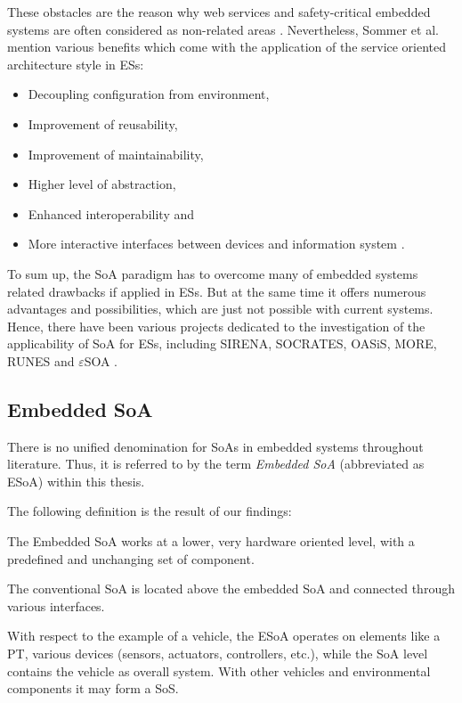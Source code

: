 These obstacles are the reason why web services and safety-critical embedded systems are often considered as non-related areas \cite{rodrigues2011}. Nevertheless, Sommer et al. mention various benefits which come with the application of the service oriented architecture style in ESs: 
\begin{itemize}
\item Decoupling configuration from environment, 
\item Improvement of reusability,
\item Improvement of maintainability,
\item Higher level of abstraction,
\item Enhanced interoperability and
\item More interactive interfaces between devices and information system \cite{buckl}.
\end{itemize}

To sum up, the SoA paradigm has to overcome many of embedded systems related drawbacks if applied in ESs. But at the same time it offers numerous advantages and possibilities, which are just not possible with current systems. Hence, there have been various projects dedicated to the investigation of the applicability of SoA for ESs, including SIRENA, SOCRATES, OASiS, MORE, RUNES and $\varepsilon$SOA \cite{buckl} \cite{sommer}. 



\subsection{Embedded SoA}
There is no unified denomination for SoAs in embedded systems throughout literature. Thus, it is referred to by the term \emph{Embedded SoA} (abbreviated as ESoA) within this thesis.

The following definition is the result of our findings:
\begin{myquote}
The Embedded SoA works at a lower, very hardware oriented level, with a predefined and unchanging set of component.

The conventional SoA is located above the embedded SoA and connected through various interfaces.
\end{myquote}

With respect to the example of a vehicle, the ESoA operates on elements like a PT, various devices (sensors, actuators, controllers, etc.), while the SoA level contains the vehicle as overall system. With other vehicles and environmental components it may form a SoS.

